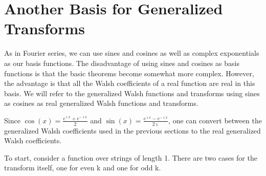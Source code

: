 \typeout{}
\chapter{Another Basis for Generalized Transforms}

As in Fourier series, we can use sines and cosines as well as complex
exponentials as our basis functions.  The disadvantage of using sines
and cosines as basis functions is that the basic theorems become somewhat
more complex.  However, the advantage is that all the Walsh coefficients
of a real function are real in this basis.  We will refer to the generalized
Walsh functions and transforms using sines as cosines as real generalized
Walsh functions and transforms.

Since $\cos(x)=\frac{e^{\imath x}+e^{-\imath x}}{2}$ and
$\sin(x)=\frac{e^{\imath x}-e^{-\imath x}}{2 \imath}$,
one can convert between the generalized Walsh coefficients used in the previous
sections to the real generalized Walsh coefficients.

To start, consider a function over strings of length 1.
There are two cases for the transform itself, one for even k and one for odd k.

